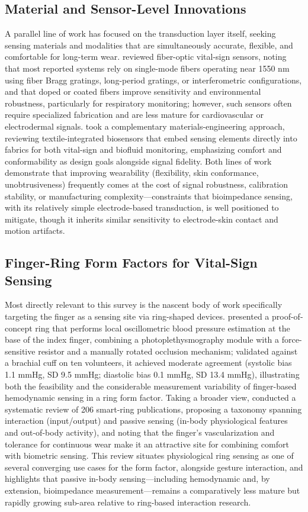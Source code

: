 \subsection{Material and Sensor-Level Innovations}
A parallel line of work has focused on the transduction layer itself, seeking sensing materials and modalities that are simultaneously accurate, flexible, and comfortable for long-term wear. \cite{mayoral2021fiber} reviewed fiber-optic vital-sign sensors, noting that most reported systems rely on single-mode fibers operating near 1550 nm using fiber Bragg gratings, long-period gratings, or interferometric configurations, and that doped or coated fibers improve sensitivity and environmental robustness, particularly for respiratory monitoring; however, such sensors often require specialized fabrication and are less mature for cardiovascular or electrodermal signals. \cite{li2023advanced} took a complementary materials-engineering approach, reviewing textile-integrated biosensors that embed sensing elements directly into fabrics for both vital-sign and biofluid monitoring, emphasizing comfort and conformability as design goals alongside signal fidelity. Both lines of work demonstrate that improving wearability (flexibility, skin conformance, unobtrusiveness) frequently comes at the cost of signal robustness, calibration stability, or manufacturing complexity---constraints that bioimpedance sensing, with its relatively simple electrode-based transduction, is well positioned to mitigate, though it inherits similar sensitivity to electrode-skin contact and motion artifacts.

\subsection{Finger-Ring Form Factors for Vital-Sign Sensing}
Most directly relevant to this survey is the nascent body of work specifically targeting the finger as a sensing site via ring-shaped devices. \cite{lindstrom2025wearable} presented a proof-of-concept ring that performs local oscillometric blood pressure estimation at the base of the index finger, combining a photoplethysmography module with a force-sensitive resistor and a manually rotated occlusion mechanism; validated against a brachial cuff on ten volunteers, it achieved moderate agreement (systolic bias 1.1 mmHg, SD 9.5 mmHg; diastolic bias 0.1 mmHg, SD 13.4 mmHg), illustrating both the feasibility and the considerable measurement variability of finger-based hemodynamic sensing in a ring form factor. Taking a broader view, \cite{wang2025computing} conducted a systematic review of 206 smart-ring publications, proposing a taxonomy spanning interaction (input/output) and passive sensing (in-body physiological features and out-of-body activity), and noting that the finger's vascularization and tolerance for continuous wear make it an attractive site for combining comfort with biometric sensing. This review situates physiological ring sensing as one of several converging use cases for the form factor, alongside gesture interaction, and highlights that passive in-body sensing---including hemodynamic and, by extension, bioimpedance measurement---remains a comparatively less mature but rapidly growing sub-area relative to ring-based interaction research.

